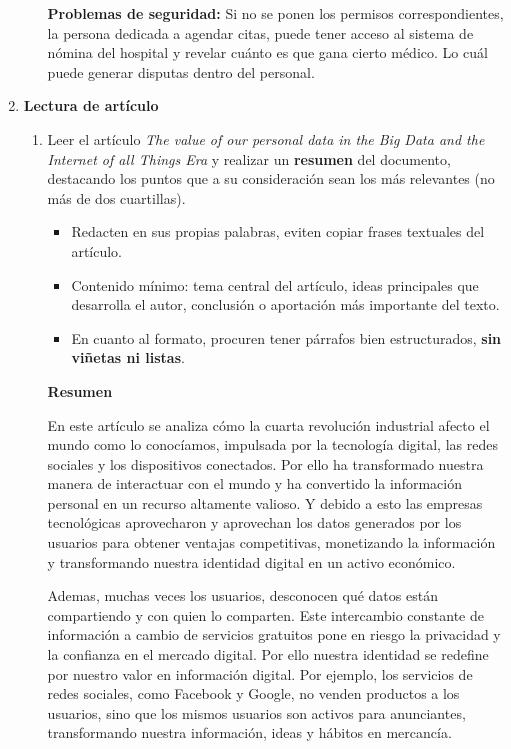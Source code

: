 \documentclass[12pt]{report}
\begin{document}
\begin{enumerate}[label=\textbf{\arabic*.}, leftmargin=*]
\begin{enumerate}[label=\textbf{\alph*.}, leftmargin=*, itemsep=1.0em]
    \textbf{Problemas de seguridad:}
    Si no se ponen los permisos correspondientes, la persona dedicada a agendar citas, puede tener acceso al sistema de nómina del hospital y revelar cuánto es que gana cierto médico. Lo cuál puede generar disputas dentro del personal.

\end{enumerate}
\newpage
\item \textbf{Lectura de art\'iculo}

\begin{enumerate}[label=\textbf{\alph*.}, leftmargin=*, itemsep=1.0em]

\item Leer el art\'iculo \textit{The value of our personal data in the Big Data and the Internet of all Things Era} y realizar un \textbf{resumen} del documento, destacando los puntos que a su consideraci\'on sean los m\'as relevantes (no m\'as de dos cuartillas).
\begin{itemize}
  \item Redacten en sus propias palabras, eviten copiar frases textuales del art\'iculo.
  \item Contenido m\'inimo: tema central del art\'iculo, ideas principales que desarrolla el autor, conclusi\'on o aportaci\'on m\'as importante del texto.
  \item En cuanto al formato, procuren tener p\'arrafos bien estructurados, \textbf{sin vi\~netas ni listas}.
\end{itemize}

\textbf{Resumen}

En este artículo se analiza cómo la cuarta revolución industrial afecto el mundo como lo conocíamos, impulsada por la tecnología digital, las redes sociales y los dispositivos conectados. Por ello ha transformado nuestra manera de interactuar con el mundo y ha convertido la información personal en un recurso altamente valioso. Y debido a esto las empresas tecnológicas aprovecharon y aprovechan los datos generados por los usuarios para obtener ventajas competitivas, monetizando la información y transformando nuestra identidad digital en un activo económico.

Ademas, muchas veces los usuarios, desconocen qué datos están compartiendo y con quien lo comparten. Este intercambio constante de información a cambio de servicios gratuitos pone en riesgo la privacidad y la confianza en el mercado digital.
Por ello nuestra identidad se redefine por nuestro valor en información digital. Por ejemplo, los servicios de redes sociales, como Facebook y Google, no venden productos a los usuarios, sino que los mismos usuarios son activos para anunciantes, transformando nuestra información, ideas y hábitos en mercancía.


\end{enumerate}
\end{enumerate}
\end{document}
